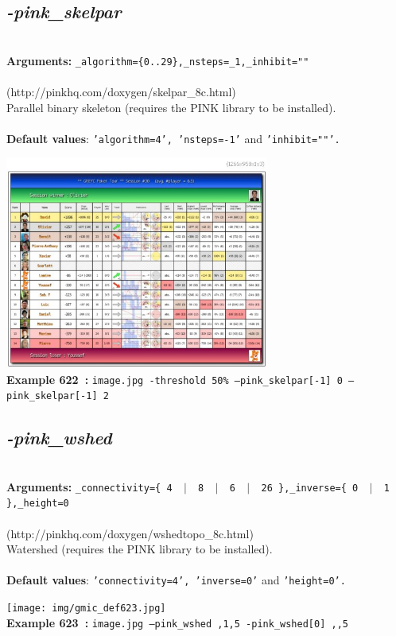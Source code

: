 \documentclass[a4paper,11pt,twoside]{book}
\begin{document}
\subsection{\emph{-pink\_skelpar} }\vspace*{-0.5em}
~\\\textbf{Arguments: } 
{\small \texttt{\_algorithm=\{0..29\},\_nsteps=\_1,\_inhibit=""}}\\~\\
(http://pinkhq.com/doxygen/skelpar\_8c.html)
~\\Parallel binary skeleton (requires the PINK library to be installed).
~\\~\\\textbf{Default values}: {\small \texttt{'algorithm=4', 'nsteps=-1'} and \texttt{'inhibit=""'.}}
\begin{center}\includegraphics[keepaspectratio=true,height=7cm,width=\textwidth]{img/gmic_def622.jpg}\\
{\footnotesize \textbf{Example 622~:} \texttt{image.jpg -threshold 50\% --pink\_skelpar[-1] 0 --pink\_skelpar[-1] 2}}
\end{center}

\subsection{\emph{-pink\_wshed} }\vspace*{-0.5em}
~\\\textbf{Arguments: } 
{\small \texttt{\_connectivity=\{ 4 ~$|$~ 8 ~$|$~ 6 ~$|$~ 26 \},\_inverse=\{ 0 ~$|$~ 1 \},\_height=0}}\\~\\
(http://pinkhq.com/doxygen/wshedtopo\_8c.html)
~\\Watershed (requires the PINK library to be installed).
~\\~\\\textbf{Default values}: {\small \texttt{'connectivity=4', 'inverse=0'} and \texttt{'height=0'.}}
\begin{center}\texttt{[image: img/gmic\_def623.jpg]}\\
{\footnotesize \textbf{Example 623~:} \texttt{image.jpg --pink\_wshed ,1,5 -pink\_wshed[0] ,,5}}
\end{center}
\end{document}
